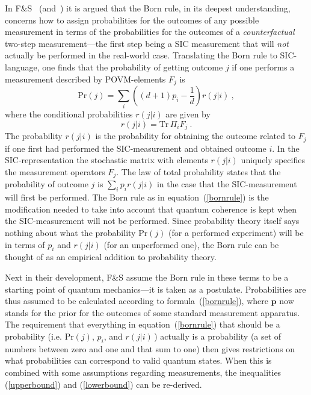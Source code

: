 \documentclass[letterpaper,11pt]{article}
\begin{document}
In F\&S~\cite{Fuchs&Schack} (and~\cite{Fuchs&SchackII}) it is argued that the Born rule, in its deepest understanding, concerns how to assign probabilities for the outcomes of any possible measurement in terms of the probabilities for the outcomes of a {\it counterfactual\/} two-step measurement---the first step being a SIC measurement that will {\it not\/} actually be performed in the real-world case. Translating the Born rule to SIC-language, one finds that the probability of getting outcome $j$ if one performs a measurement described by POVM-elements $F_j$ is
%
\begin{equation} \label{bornrule}
  \textrm{Pr}(j) = \sum_i \left(\!(d+1)p_i  - \frac{1}{d} \right) r(j|i) \ ,
\end{equation}
%
where the conditional probabilities $r(j|i)$ are given by
%
\begin{equation}
  r(j|i) = \textrm{Tr} \,\Pi_i F_j \ .
\end{equation}
%
The probability $r(j|i)$ is the probability for obtaining the outcome related to $F_j$ if one first had performed the SIC-measurement and obtained outcome $i$. In the SIC-representation the stochastic matrix with elements $r(j|i)$ uniquely specifies the measurement operators $F_j$. The law of total probability states that the probability of outcome $j$  is $\sum_i p_i r(j|i)$ in the case that the SIC-measurement will first be performed. The Born rule as in equation~(\ref{bornrule}) is the modification needed to take into account that quantum coherence is kept when the SIC-measurement will not be performed. Since probability theory itself says nothing about what the probability $\textrm{Pr}(j)$ (for a performed experiment) will be in terms of $p_i$ and $r(j|i)$ (for an unperformed one), the Born rule can be thought of as an empirical addition to probability theory.

Next in their development, F\&S assume the Born rule in these terms to be a starting point of quantum mechanics---it is taken as a postulate. Probabilities are thus assumed to be calculated according to formula~(\ref{bornrule}), where $\mathbf p$ now stands for the prior for the outcomes of some standard measurement apparatus. The requirement that everything in equation~(\ref{bornrule}) that should be a probability (i.e. $\textrm{Pr}(j)$, $p_i$, and $r(j|i)\,$) actually is a probability (a set of numbers between zero and one and that sum to one) then gives restrictions on what probabilities can correspond to valid quantum states. When this is combined with some assumptions regarding measurements, the inequalities (\ref{upperbound}) and (\ref{lowerbound}) can be re-derived.
\end{document}
